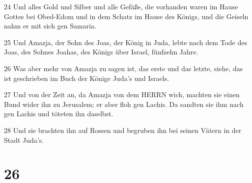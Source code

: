 \par 24 Und alles Gold und Silber und alle Gefäße, die vorhanden waren im Hause Gottes bei Obed-Edom und in dem Schatz im Hause des Königs, und die Geiseln nahm er mit sich gen Samaria.
\par 25 Und Amazja, der Sohn des Joas, der König in Juda, lebte nach dem Tode des Joas, des Sohnes Joahas, des Königs über Israel, fünfzehn Jahre.
\par 26 Was aber mehr von Amazja zu sagen ist, das erste und das letzte, siehe, das ist geschrieben im Buch der Könige Juda's und Israels.
\par 27 Und von der Zeit an, da Amazja von dem HERRN wich, machten sie einen Bund wider ihn zu Jerusalem; er aber floh gen Lachis. Da sandten sie ihm nach gen Lachis und töteten ihn daselbst.
\par 28 Und sie brachten ihn auf Rossen und begruben ihn bei seinen Vätern in der Stadt Juda's.

\chapter{26}


